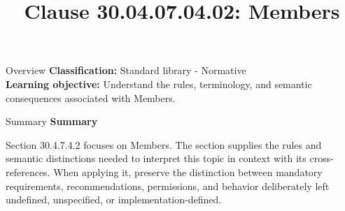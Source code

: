 \documentclass[10pt,letterpaper]{article}
\title{Clause 30.04.07.04.02: Members}
\author{}
\date{}
\begin{document}
\maketitle
\begin{CornellOverviewBox}{Overview}
\textbf{Classification:} Standard library - Normative\\[2pt]
\textbf{Learning objective:} Understand the rules, terminology, and semantic consequences associated with Members.
\end{CornellOverviewBox}\begin{CornellSummaryBox}{Summary}
{\sffamily\bfseries\color{Accent} Summary}\par\vspace{3pt}Section 30.4.7.4.2 focuses on Members. The section supplies the rules and semantic distinctions needed to interpret this topic in context with its cross-references. When applying it, preserve the distinction between mandatory requirements, recommendations, permissions, and behavior deliberately left undefined, unspecified, or implementation-defined.
\end{CornellSummaryBox}
\end{document}
